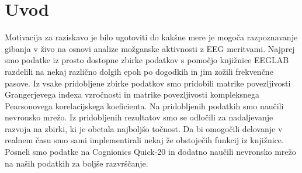\chapter{Uvod}
\thispagestyle{fancy}
Motivacija za raziskavo je bilo ugotoviti do kakšne mere je mogoča razpoznavanje gibanja v živo na osnovi analize možganske aktivnosti z EEG meritvami. Najprej smo podatke iz prosto dostopne zbirke podatkov s pomočjo knjižnice EEGLAB razdelili na nekaj različno dolgih epoh po dogodkih in jim zožili frekvenčne pasove. Iz vsake pridobljene zbirke podatkov smo pridobili matrike povezljivosti Grangerjevega indexa vzročnosti in matrike povezljivosti kompleksnega Pearsonovega korelacijskega koeficienta. Na pridobljenih podatkih smo naučili nevronsko mrežo. Iz pridobljenih rezultatov smo se odločili za nadaljevanje razvoja na zbirki, ki je obetala najboljšo točnost. Da bi omogočili delovanje v realnem času smo sami implementirali nekaj že obstoječih funkcij iz knjižnice. Posneli smo podatke na Cognionics Quick-20 in dodatno naučili nevronsko mrežo na naših podatkih za boljše razvrščanje.
\newpage
